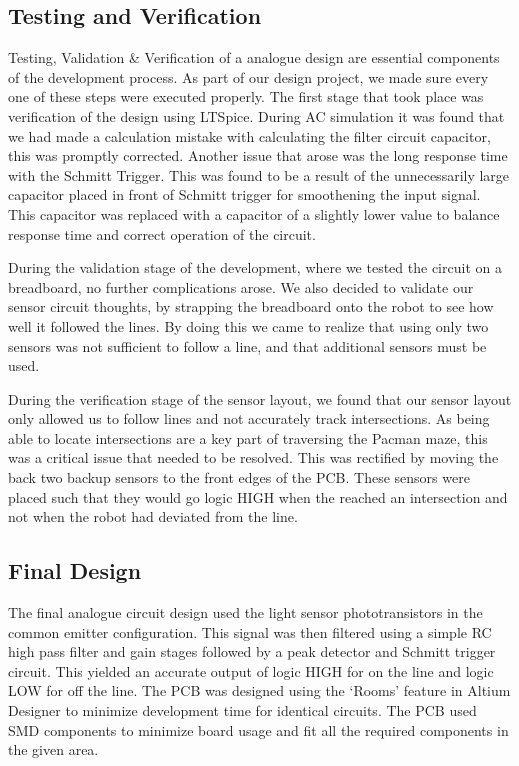\documentclass{article}
\begin{document}
\subsection{Testing and Verification}

Testing, Validation \& Verification of a analogue design are essential components of the development process. As part of our design project, we made sure every one of these steps were executed properly. The first stage that took place was verification of the design using LTSpice. During AC simulation it was found that we had made a calculation mistake with calculating the filter circuit capacitor, this was promptly corrected. Another issue that arose was the long response time with the Schmitt Trigger. This was found to be a result of the unnecessarily large capacitor placed in front of Schmitt trigger for smoothening the input signal. This capacitor was replaced with a capacitor of a slightly lower value to balance response time and correct operation of the circuit.

During the validation stage of the development, where we tested the circuit on a breadboard, no further complications arose. We also decided to validate our sensor circuit thoughts, by strapping the breadboard onto the robot to see how well it followed the lines. By doing this we came to realize that using only two sensors was not sufficient to follow a line, and that additional sensors must be used. 

During the verification stage of the sensor layout, we found that our sensor layout only allowed us to follow lines and not accurately track intersections. As being able to locate intersections are a key part of traversing the Pacman maze, this was a critical issue that needed to be resolved. This was rectified by moving the back two backup sensors to the front edges of the PCB. These sensors were placed such that they would go logic HIGH when the reached an intersection and not when the robot had deviated from the line.

\subsection{Final Design}

The final analogue circuit design used the light sensor phototransistors in the common emitter configuration. This signal was then filtered using a simple RC high pass filter and gain stages followed by a peak detector and Schmitt trigger circuit. This yielded an accurate output of logic HIGH for on the line and logic LOW for off the line. The PCB was designed using the `Rooms' feature in Altium Designer to minimize development time for identical circuits. The PCB used SMD components to minimize board usage and fit all the required components in the given area.
\end{document}

